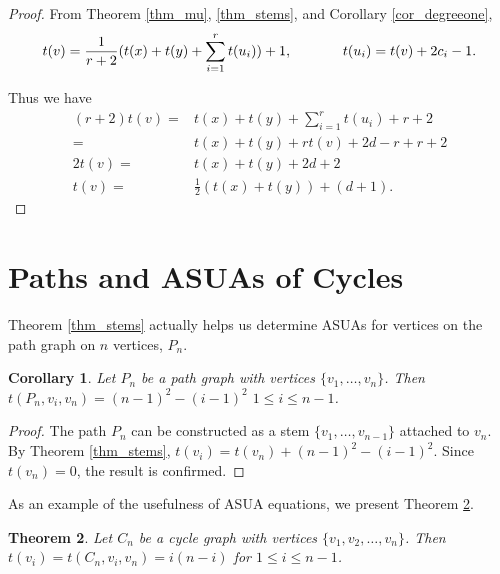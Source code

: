 \documentclass{article}
\newtheorem{theorem}{Theorem}[section]  %
\newtheorem{corollary}[theorem]{Corollary}
\theoremstyle{definition}
\begin{document}
\begin{proof}
    From Theorem \ref{thm_mu}, \ref{thm_stems}, and Corollary \ref{cor_degreeone}, 
    \[t(v) = \frac{1}{r+2}(t(x) + t(y) + \sum_{i=1}^r t(u_i)) + 1, \text{\hspace{.5in}} t(u_i) = t(v) + 2c_i  - 1.\]

Thus we have 
\begin{align*}
    (r+2)t(v) = & t(x) + t(y) + \sum_{i=1}^r t(u_i) + r + 2 \\
                = & t(x) + t(y) + rt(v) + 2d - r + r + 2 \\
    2t(v) = & t(x) + t(y) + 2d + 2 \\
    t(v) = & \frac{1}{2}(t(x) + t(y)) + (d+1).
\end{align*}
    
\end{proof}





\section{Paths and ASUAs of Cycles}


Theorem \ref{thm_stems} actually helps us determine ASUAs for vertices on the path graph on $n$ vertices, $P_n$.

\begin{corollary}
    Let $P_n$ be a path graph with vertices $\{v_1,\ldots,v_n\}$. Then $t(P_n,v_i,v_n) = (n-1)^2 - (i-1)^2$  $1 \leq i \leq n - 1$.
\end{corollary}

\begin{proof}
    The path $P_n$ can be constructed as a stem $\{v_1,\ldots,v_{n-1}\}$ attached to $v_n$. By Theorem \ref{thm_stems}, $t(v_i) = t(v_n) + (n-1)^2 - (i-1)^2.$ Since $t(v_n) = 0$, the result is confirmed.
\end{proof}


\noindent As an example of the usefulness of ASUA equations, we present Theorem \ref{thm_cycles}. 

\begin{theorem}
\label{thm_cycles}
    Let $C_n$ be a cycle graph with vertices $\{v_1,v_2,\ldots,v_n\}$. Then $t(v_i)=t(C_n,v_i,v_n) = i(n-i)$ for $1 \leq i\leq n-1$.
\end{theorem} 
\end{document}
